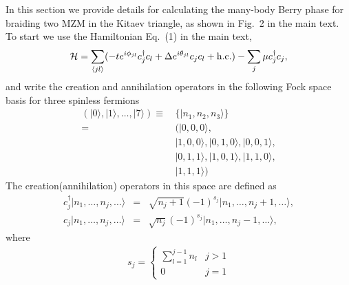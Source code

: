 \documentclass[aps,prb,showpacs,amsmath,amssymb,superscriptaddress]{revtex4-2}
\newcommand{\ham}{\mathcal{H}}
\newcommand{\cc}{c^{\dagger}}
\newcommand{\de}{\Delta}
\begin{document}
In this section we provide details for calculating the many-body Berry phase for braiding two MZM in the Kitaev triangle, as shown in Fig.~2 in the main text. To start we use the Hamiltonian Eq.~(1) in the main text,
\begin{equation}\label{eq:HBdG}
  \ham = \sum_{\langle j l \rangle} (-te^{i\phi_{jl}}\cc_{j} c_l + \de e^{i\theta_{jl}} c_{j} c_l + {\rm h.c.}) - \sum_{j} \mu \cc_j c_j,
\end{equation}
and write the creation and annihilation operators in the following Fock space basis for three spinless fermions
\begin{align*}
\left(|0\rangle, |1\rangle, \dots, |7\rangle\right) \equiv \,& \{ |n_1,n_2,n_3\rangle \}\\
  =\,&\big(|0,0,0 \rangle, \\
  &|1,0,0 \rangle, |0,1,0 \rangle, |0,0,1 \rangle, \\
  &|0,1,1 \rangle, |1,0,1 \rangle, |1,1,0 \rangle, \\
  &|1,1,1 \rangle\big )
\end{align*}
The creation(annihilation) operators in this space are defined as
\begin{eqnarray}
  \cc_j |n_1,\dots,n_j, \dots\rangle &=& \sqrt{n_j+1}(-1)^{s_j}|n_1,\dots,n_j+1,\dots\rangle, \\\nonumber
  c_j |n_1,\dots,n_j, \dots\rangle &=& \sqrt{n_j} (-1)^{s_j}|n_1,\dots,n_j-1,\dots\rangle,
\end{eqnarray}
where
\begin{eqnarray}
  s_j =
  \begin{cases}
    \sum_{l=1}^{j-1} n_l &  j>1 \\
    0 & j = 1
  \end{cases}
\end{eqnarray}
\end{document}
